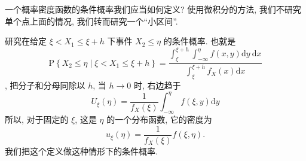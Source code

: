 一个概率密度函数的条件概率我们应当如何定义? 使用微积分的方法, 我们不研究单个点上面的情况, 我们转而研究一个``小区间''.

研究在给定 $\xi<X_1 \leqslant \xi+h$ 下事件 $X_2 \leqslant \eta$ 的条件概率. 也就是$$\mathrm{P}\left\{X_2 \leqslant \eta \mid \xi<X_1 \leqslant \xi+h\right\}=\frac{\int_{\xi}^{\xi+h}  \int_{-\infty}^\eta f(x, y) \mathrm{d} y\mathrm{~d} x}{\int_{\xi}^{\xi+h} f_X(x) \mathrm{d} x}$$, 把分子和分母同除以 $h$, 当 $h \rightarrow 0$ 时, 右边趋于$$U_{\xi}(\eta)=\frac{1}{f_X(\xi)} \int_{-\infty}^\eta f(\xi, y) \mathrm{d} y$$
所以, 对于固定的 $\xi$, 这是 $\eta$ 的一个分布函数, 它的密度为$$u_{\xi}(\eta)=\frac{1}{f_X(\xi)} f(\xi, \eta).$$ 我们把这个定义做这种情形下的条件概率. 


